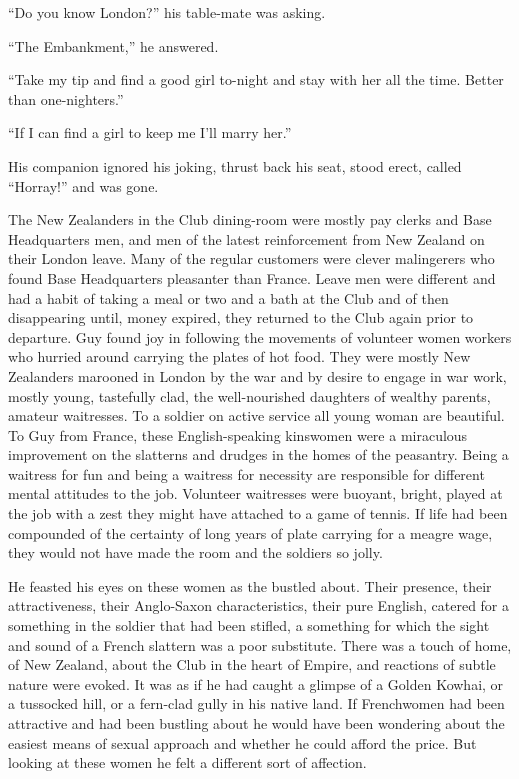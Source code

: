 ``Do you know London?'' his table-mate was asking.

``The Embankment,'' he answered.

``Take my tip and find a good girl to-night and stay with her all the time. Better than one-nighters.''

``If I can find a girl to keep me I'll marry her.''

His companion ignored his joking, thrust back his seat, stood erect, called ``Horray!'' and was gone.

The New Zealanders in the Club dining-room were mostly pay clerks and Base Headquarters men, and men of the latest reinforcement from New Zealand on their London leave. Many of the regular customers were clever malingerers who found Base Headquarters pleasanter than France. Leave men were different and had a habit of taking a meal or two and a bath at the Club and of then disappearing until, money expired, they returned to the Club again prior to departure. Guy found joy in following the movements of volunteer women workers who hurried around carrying the plates of hot food. They were mostly New Zealanders marooned in London by the war and by desire to engage in war work, mostly young, tastefully clad, the well-nourished daughters of wealthy parents, amateur waitresses. To a soldier on active service all young woman are beautiful. To Guy from France, these English-speaking kinswomen were a miraculous improvement on the slatterns and drudges in the homes of the peasantry. Being a waitress for fun and being a waitress for necessity are responsible for different mental attitudes to the job. Volunteer waitresses were buoyant, bright, played at the job with a zest they might have attached to a game of tennis. If life had been compounded of the certainty of long years of plate carrying for a meagre wage, they would not have made the room and the soldiers so jolly.

He feasted his eyes on these women as the bustled about. Their presence, their attractiveness, their Anglo-Saxon characteristics, their pure English, catered for a something in the soldier that had been stifled, a something for which the sight and sound of a French slattern was a poor substitute. There was a touch of home, of New Zealand, about the Club in the heart of Empire, and reactions of subtle nature were evoked. It was as if he had caught a glimpse of a Golden Kowhai, or a tussocked hill, or a fern-clad gully in his native land. If Frenchwomen had been attractive and had been bustling about he would have been wondering about the easiest means of sexual approach and whether he could afford the price. But looking at these women he felt a different sort of affection.

